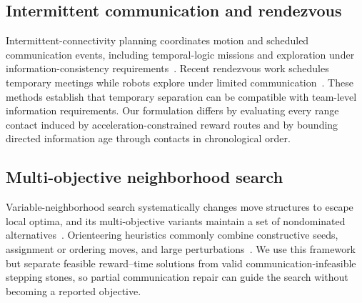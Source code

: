 \subsection{Intermittent communication and rendezvous}
Intermittent-connectivity planning coordinates motion and scheduled communication events, including temporal-logic missions and exploration under information-consistency requirements~\cite{kantaros2016intermittent,kantaros2017temporal,klaesson2019intermittent}. Recent rendezvous work schedules temporary meetings while robots explore under limited communication~\cite{silva2023rendezvous}. These methods establish that temporary separation can be compatible with team-level information requirements. Our formulation differs by evaluating every range contact induced by acceleration-constrained reward routes and by bounding directed information age through contacts in chronological order.

\subsection{Multi-objective neighborhood search}
Variable-neighborhood search systematically changes move structures to escape local optima, and its multi-objective variants maintain a set of nondominated alternatives~\cite{hansen2017vns,duarte2015movns}. Orienteering heuristics commonly combine constructive seeds, assignment or ordering moves, and large perturbations~\cite{gunawan2016survey}. We use this framework but separate feasible reward--time solutions from valid communication-infeasible stepping stones, so partial communication repair can guide the search without becoming a reported objective.
